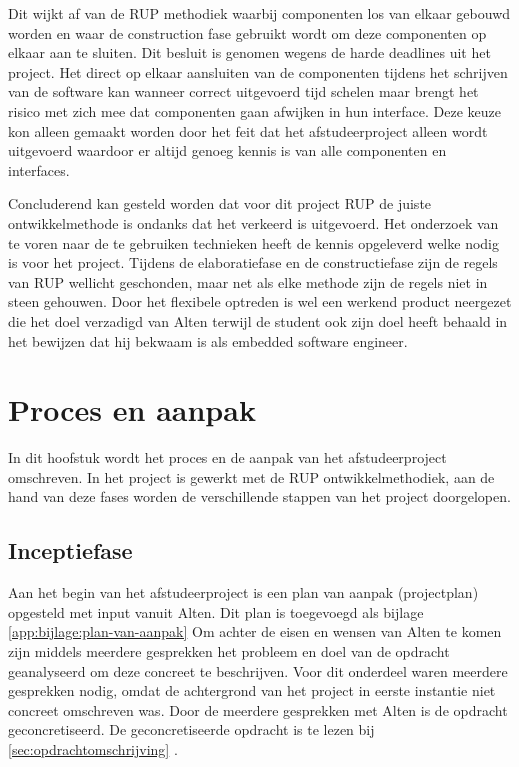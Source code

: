 \documentclass[a4paper, 11pt, oneside]{report}
\begin{document}
Dit wijkt af van de RUP methodiek waarbij componenten los van elkaar gebouwd worden en waar de construction fase gebruikt wordt om deze componenten op elkaar aan te sluiten. Dit besluit is genomen wegens de harde deadlines uit het project. Het direct op elkaar aansluiten van de componenten tijdens het schrijven van de software kan wanneer correct uitgevoerd tijd schelen maar brengt het risico met zich mee dat componenten gaan afwijken in hun interface. Deze keuze kon alleen gemaakt worden door het feit dat het afstudeerproject alleen wordt uitgevoerd waardoor er altijd genoeg kennis is van alle componenten en interfaces.

Concluderend kan gesteld worden dat voor dit project RUP de juiste ontwikkelmethode is ondanks dat het verkeerd is uitgevoerd. 
Het onderzoek van te voren naar de te gebruiken technieken heeft de kennis opgeleverd welke nodig is voor het project. Tijdens de elaboratiefase en de constructiefase zijn de regels van RUP wellicht geschonden, maar net als elke methode zijn de regels niet in steen gehouwen.
Door het flexibele optreden is wel een werkend product neergezet die het doel verzadigd van Alten terwijl de student ook zijn doel heeft behaald in het bewijzen dat hij bekwaam is als embedded software engineer. 
 

\chapter{Proces en aanpak}\label{sec:proces-en-aanpak}
In dit hoofstuk wordt het proces en de aanpak van het afstudeerproject omschreven.
In het project is gewerkt met de RUP ontwikkelmethodiek, aan de hand van deze fases worden de verschillende stappen van het project doorgelopen.

\section{Inceptiefase}\label{sec:inceptiefase}

Aan het begin van het afstudeerproject is een plan van aanpak (projectplan) opgesteld met input vanuit Alten.
Dit plan is toegevoegd als bijlage \ref{app:bijlage:plan-van-aanpak}
Om achter de eisen en wensen van Alten te komen zijn middels meerdere gesprekken het probleem en doel van de opdracht geanalyseerd om deze concreet te beschrijven.
Voor dit onderdeel waren meerdere gesprekken nodig, omdat de achtergrond van het project in eerste instantie niet concreet omschreven was.
Door de meerdere gesprekken met Alten is de opdracht geconcretiseerd. De geconcretiseerde opdracht is te lezen bij \autoref{sec:opdrachtomschrijving} .
\end{document}
